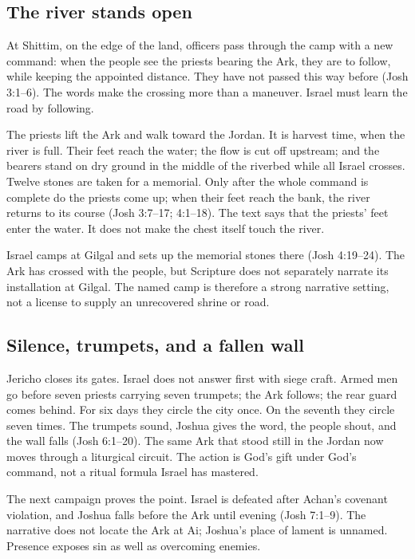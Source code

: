 \subsection{The river stands open}

At Shittim, on the edge of the land, officers pass through the camp with a new
command: when the people see the priests bearing the Ark, they are to follow,
while keeping the appointed distance.  They have not passed this way before
(Josh 3:1--6).  The words make the crossing more than a maneuver.  Israel must
learn the road by following.

The priests lift the Ark and walk toward the Jordan.  It is harvest time, when
the river is full.  Their feet reach the water; the flow is cut off upstream;
and the bearers stand on dry ground in the middle of the riverbed while all
Israel crosses.  Twelve stones are taken for a memorial.  Only after the whole
command is complete do the priests come up; when their feet reach the bank, the
river returns to its course (Josh 3:7--17; 4:1--18).  The text says that the
priests' feet enter the water.  It does not make the chest itself touch the
river.

Israel camps at Gilgal and sets up the memorial stones there
(Josh 4:19--24).  The Ark has crossed with the people, but Scripture does not
separately narrate its installation at Gilgal.  The named camp is therefore a
strong narrative setting, not a license to supply an unrecovered shrine or
road.

\subsection{Silence, trumpets, and a fallen wall}

Jericho closes its gates.  Israel does not answer first with siege craft.
Armed men go before seven priests carrying seven trumpets; the Ark follows;
the rear guard comes behind.  For six days they circle the city once.  On the
seventh they circle seven times.  The trumpets sound, Joshua gives the word,
the people shout, and the wall falls (Josh 6:1--20).  The same Ark that stood
still in the Jordan now moves through a liturgical circuit.  The action is
God's gift under God's command, not a ritual formula Israel has mastered.

The next campaign proves the point.  Israel is defeated after Achan's covenant
violation, and Joshua falls before the Ark until evening (Josh 7:1--9).  The
narrative does not locate the Ark at Ai; Joshua's place of lament is unnamed.
Presence exposes sin as well as overcoming enemies.

